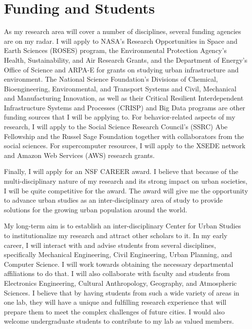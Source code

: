 \documentclass[12pt]{article}
\begin{document}
\section*{Funding and Students}
As my research area will cover a number of disciplines, several funding agencies are on my radar. I will apply to NASA's Research Opportunities in Space and Earth Sciences (ROSES) program, the Environmental Protection Agency's Health, Sustainability, and Air Research Grants, and the Department of Energy's Office of Science and ARPA-E for grants on studying urban infrastructure and environment. The National Science Foundation's Divisions of Chemical, Bioengineering, Environmental, and Transport Systems and Civil, Mechanical and Manufacturing Innovation, as well as their Critical Resilient Interdependent Infrastructure Systems and Processes (CRISP) and Big Data programs are other funding sources that I will be applying to. For behavior-related aspects of my research, I will apply to the Social Science Research Council's (SSRC) Abe Fellowship and the Russel Sage Foundation together with collaborators from the social sciences. For supercomputer resources, I will apply to the XSEDE network and Amazon Web Services (AWS) research grants. 

Finally, I will apply for an NSF CAREER award. I believe that because of the multi-disciplinary nature of my research and its strong impact on urban societies, I will be quite competitive for the award. The award will give me the opportunity to advance urban studies as an inter-disciplinary area of study to provide solutions for the growing urban population around the world.  

My long-term aim is to establish an inter-disciplinary Center for Urban Studies to institutionalize my research and attract other scholars to it. In my early career, I will interact with and advise students from several disciplines, specifically Mechanical Engineering, Civil Engineering, Urban Planning, and Computer Science. I will work towards obtaining the necessary departmental affiliations to do that. I will also collaborate with faculty and students from Electronics Engineering, Cultural Anthropology, Geography, and Atmospheric Sciences. I believe that by having students from such a wide variety of areas in one lab, they will have a unique and fulfilling research experience that will prepare them to meet the complex challenges of future cities. I would also welcome undergraduate students to contribute to my lab as valued members.

 

\end{document}
